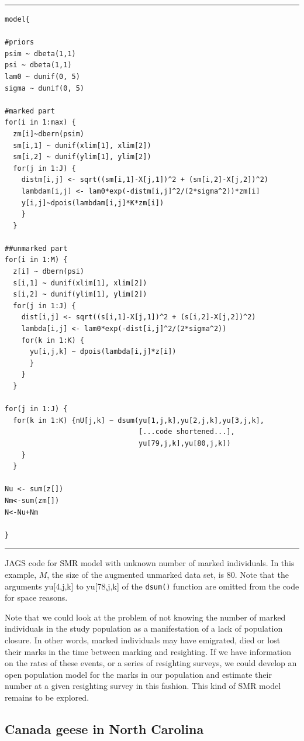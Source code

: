 \begin{panel}[htp]
\centering
\rule[0.15in]{\textwidth}{.03in}
{\small
\begin{verbatim}
model{

#priors
psim ~ dbeta(1,1)
psi ~ dbeta(1,1)
lam0 ~ dunif(0, 5)
sigma ~ dunif(0, 5)

#marked part
for(i in 1:max) {
  zm[i]~dbern(psim)
  sm[i,1] ~ dunif(xlim[1], xlim[2])
  sm[i,2] ~ dunif(ylim[1], ylim[2])
  for(j in 1:J) {
    distm[i,j] <- sqrt((sm[i,1]-X[j,1])^2 + (sm[i,2]-X[j,2])^2)
    lambdam[i,j] <- lam0*exp(-distm[i,j]^2/(2*sigma^2))*zm[i]
    y[i,j]~dpois(lambdam[i,j]*K*zm[i])
    }
  }

##unmarked part
for(i in 1:M) {
  z[i] ~ dbern(psi)
  s[i,1] ~ dunif(xlim[1], xlim[2])
  s[i,2] ~ dunif(ylim[1], ylim[2])
  for(j in 1:J) {
    dist[i,j] <- sqrt((s[i,1]-X[j,1])^2 + (s[i,2]-X[j,2])^2)
    lambda[i,j] <- lam0*exp(-dist[i,j]^2/(2*sigma^2))
    for(k in 1:K) {
      yu[i,j,k] ~ dpois(lambda[i,j]*z[i])
      }
    }
  }

for(j in 1:J) {
  for(k in 1:K) {nU[j,k] ~ dsum(yu[1,j,k],yu[2,j,k],yu[3,j,k],
								[...code shortened...],
								yu[79,j,k],yu[80,j,k])
	}
  }

Nu <- sum(z[])
Nm<-sum(zm[])
N<-Nu+Nm

}
\end{verbatim}
}
\rule[-0.15in]{\textwidth}{.03in}
\caption{
JAGS code for SMR model with unknown number of marked individuals. In this example, $M$, the size of the augmented unmarked data set, is 80. Note that the arguments yu[4,j,k] to yu[78,j,k] of the {\tt dsum()} function are omitted from the code for space reasons.
}
\label{partialID.panel.unknownm}
\end{panel}

Note that we could look at the problem of not knowing the number of marked individuals in the study population as a manifestation of a lack of population closure. In other words, marked individuals may have emigrated, died or lost their marks in the time between marking and resighting. If we have information on the rates of these events, or a series of resighting surveys, we could develop an open population model for the marks in our population and estimate their number at a given resighting survey in this fashion. This kind of SMR model remains to be explored.

\subsection{Canada geese in North Carolina}

